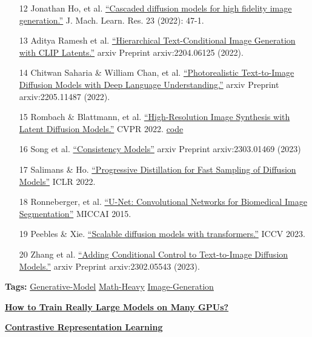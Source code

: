 \documentclass[12pt]{article}
\begin{document}
\begin{itemize}
    \item [12] Jonathan Ho, et al. \href{https://arxiv.org/abs/2106.15282}{“Cascaded diffusion models for high fidelity image generation.”} J. Mach. Learn. Res. 23 (2022): 47-1.
    \item [13] Aditya Ramesh et al. \href{https://arxiv.org/abs/2204.06125}{“Hierarchical Text-Conditional Image Generation with CLIP Latents.”} arxiv Preprint arxiv:2204.06125 (2022).
    \item [14] Chitwan Saharia \& William Chan, et al. \href{https://arxiv.org/abs/2205.11487}{“Photorealistic Text-to-Image Diffusion Models with Deep Language Understanding.”} arxiv Preprint arxiv:2205.11487 (2022).
    \item [15] Rombach \& Blattmann, et al. \href{https://arxiv.org/abs/2112.10752}{“High-Resolution Image Synthesis with Latent Diffusion Models.”} CVPR 2022. \href{https://github.com/CompVis/latent-diffusion}{code}
    \item [16] Song et al. \href{https://arxiv.org/abs/2303.01469}{“Consistency Models”} arxiv Preprint arxiv:2303.01469 (2023)
    \item [17] Salimans \& Ho. \href{https://arxiv.org/abs/2202.00512}{“Progressive Distillation for Fast Sampling of Diffusion Models”} ICLR 2022.
    \item [18] Ronneberger, et al. \href{https://arxiv.org/abs/1505.04597}{“U-Net: Convolutional Networks for Biomedical Image Segmentation”} MICCAI 2015.
    \item [19] Peebles \& Xie. \href{https://arxiv.org/abs/2212.09748}{“Scalable diffusion models with transformers.”} ICCV 2023.
    \item [20] Zhang et al. \href{https://arxiv.org/abs/2302.05543}{“Adding Conditional Control to Text-to-Image Diffusion Models.”} arxiv Preprint arxiv:2302.05543 (2023).
\end{itemize}

\vspace{2em}
\noindent
\textbf{Tags:}
\href{https://lilianweng.github.io/tags/generative-model/}{Generative-Model} \quad
\href{https://lilianweng.github.io/tags/math-heavy/}{Math-Heavy} \quad
\href{https://lilianweng.github.io/tags/image-generation/}{Image-Generation}

\vspace{2em}
\noindent
\begin{minipage}{0.48\textwidth}
    \raggedright
    \textbf{\href{https://lilianweng.github.io/posts/2021-09-25-train-large/}{\textlangle\quad How to Train Really Large Models on Many GPUs?}}
\end{minipage}
\hfill
\begin{minipage}{0.48\textwidth}
    \raggedleft
    \textbf{\href{https://lilianweng.github.io/posts/2021-05-31-contrastive/}{Contrastive Representation Learning \quad\textrangle}}
\end{minipage}
\vspace{2em}
\end{document}
